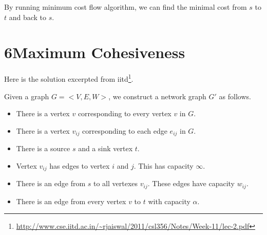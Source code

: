 \documentclass[a4paper,12pt]{article}
\begin{document}
By running minimum cost flow algorithm, we can find the minimal cost from $s$ to $t$ and back to $s$.

\section*{6\quad Maximum Cohesiveness}

Here is the solution excerpted from iitd\footnote{\url{http://www.cse.iitd.ac.in/~rjaiswal/2011/csl356/Notes/Week-11/lec-2.pdf}}.

Given a graph $G=<V,E,W>$, we construct a network graph $G'$ as follows.
\begin{itemize}
  \item There is a vertex $v$ corresponding to every vertex $v$ in $G$.
  \item There is a vertex $v_{ij}$ corresponding to each edge $e_{ij}$ in $G$.
  \item There is a source $s$ and a sink vertex $t$.
  \item Vertex $v_{ij}$ has edges to vertex $i$ and $j$. This has capacity $\infty$.
  \item There is an edge from $s$ to all vertexes $v_{ij}$. These edges have capacity $w_{ij}$.
  \item There is an edge from every vertex $v$ to $t$ with capacity $\alpha$.
\end{itemize}
\end{document}
